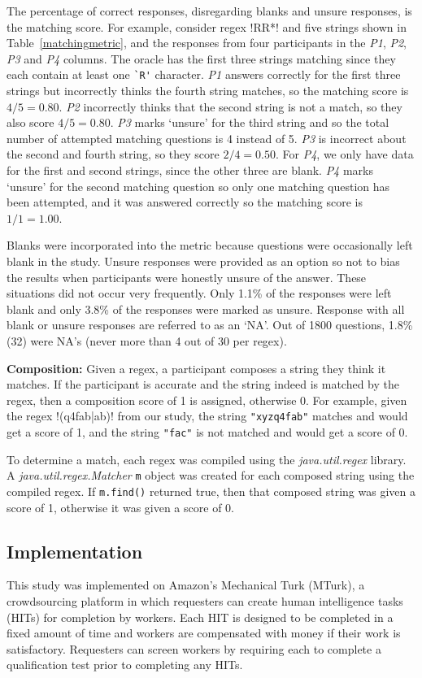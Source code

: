 The percentage of correct responses, disregarding blanks and unsure responses, is the matching score.
For example, consider regex \cverb!RR*! and five strings shown in Table~\ref{matchingmetric}, and the responses from four participants in the \emph{P1}, \emph{P2}, \emph{P3} and \emph{P4} columns.
The oracle has the first three strings matching since they each contain at least one \verb!`R'! character. \emph{P1} answers correctly for the first three strings but incorrectly thinks the fourth string matches, so the matching score is $4/5 = 0.80$. \emph{P2} incorrectly thinks that the second string is not a match, so they also score $4/5 = 0.80$.  \emph{P3} marks `unsure' for the third string and so the total number of attempted matching questions is 4 instead of 5. \emph{P3} is incorrect about the second and fourth string, so they score $2/4 = 0.50$.  For \emph{P4}, we only have data for the first and second strings, since the other three are blank.  \emph{P4} marks `unsure' for the second matching question so only one matching question has been attempted, and it was answered correctly so the matching score is $1/1 = 1.00$.

Blanks were incorporated into the metric because questions were occasionally left blank in the study. Unsure responses were provided as an option so not to bias the  results when participants were honestly unsure of the answer. These situations did not occur very frequently. Only 1.1\% of the responses were left blank and only 3.8\% of the responses were marked as unsure.  Response with all blank or unsure responses are referred to as an `NA'. Out of 1800 questions, 1.8\%(32) were NA's (never more than 4 out of 30 per regex).

\textbf{Composition:}
Given a regex, a participant composes a string they think it matches. If the participant is accurate and the string indeed is matched by the regex, then a composition score of 1 is assigned, otherwise 0.  For example, given the regex \cverb!(q4fab|ab)! from our study, the string \verb!"xyzq4fab"! matches and would get a score of 1, and the string \verb!"fac"! is not matched and would get a score of 0.

To determine a match, each regex was compiled using the \emph{java.util.regex} library. A \emph{java.util.regex.Matcher} {\tt m} object was created for each composed string using the compiled regex.  If {\tt m.find()} returned true, then that composed string was given a score of 1, otherwise it was given a score of 0.

\subsection{Implementation}
This study was implemented on Amazon's Mechanical Turk (MTurk),  a crowdsourcing platform in which requesters can create human intelligence tasks (HITs) for completion by workers. Each HIT is designed to be completed in a fixed amount of time and workers are compensated with money if their work is satisfactory. Requesters can screen workers by requiring each to complete a qualification test prior to completing any HITs.

